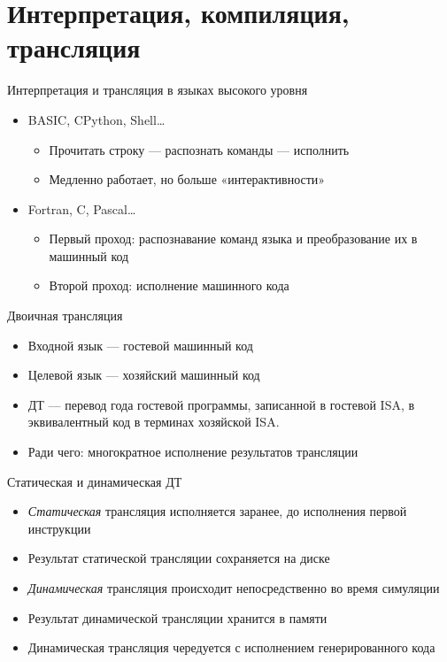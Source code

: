 \documentclass{beamer}
\begin{document}
\section{Интерпретация, компиляция, трансляция}

\begin{frame}{Интерпретация и трансляция в языках высокого уровня}
\begin{itemize}
\item BASIC, CPython, Shell\dots
    \begin{itemize}
    \item Прочитать строку — распознать команды — исполнить
    \item Медленно работает, но больше «интерактивности»
    \end{itemize}
\item Fortran, C, Pascal\dots
    \begin{itemize}
    \item Первый проход: распознавание команд языка и преобразование их в машинный код
    \item Второй проход: исполнение машинного кода
    \end{itemize}
\end{itemize}
\end{frame}

\begin{frame}{Двоичная трансляция}
\begin{itemize}
\item Входной язык — гостевой машинный код
\item Целевой язык — хозяйский машинный код
\item ДТ — перевод года гостевой программы, записанной в гостевой ISA, в эквивалентный код в терминах хозяйской ISA.
\item Ради чего: многократное исполнение результатов трансляции
\end{itemize}
\end{frame}

\begin{frame}{Статическая и динамическая ДТ}
\begin{itemize}
    \item \textit{Статическая} трансляция исполняется заранее, до исполнения первой инструкции
    \item Результат статической трансляции сохраняется на диске
    \item \textit{Динамическая} трансляция происходит непосредственно во время симуляции
    \item Результат динамической трансляции хранится в памяти
    \item Динамическая трансляция чередуется с исполнением генерированного кода
\end{itemize}

\end{frame}
\end{document}
